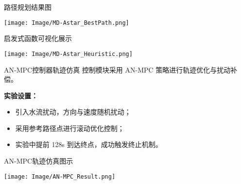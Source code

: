 \begin{frame}[plain]{路径规划结果图}
\begin{center}
    \texttt{[image: Image/MD-Astar\_BestPath.png]}
\end{center}
\end{frame}

\begin{frame}[plain]{启发式函数可视化展示}
\begin{center}
    \texttt{[image: Image/MD-Astar\_Heuristic.png]}
\end{center}
\end{frame}

\begin{frame}{AN-MPC控制器轨迹仿真}
\justifying
控制模块采用 AN-MPC 策略进行轨迹优化与扰动补偿。

\vspace{0.5em}
\textbf{实验设置：}
\begin{itemize}
    \item 引入水流扰动，方向与速度随机扰动；
    \item 采用参考路径点进行滚动优化控制；
    \item 实验中提前 128s 到达终点，成功触发终止机制。
\end{itemize}
\end{frame}

\begin{frame}[plain]{AN-MPC轨迹仿真图示}
\begin{center}
    \texttt{[image: Image/AN-MPC\_Result.png]}
\end{center}
\end{frame}
